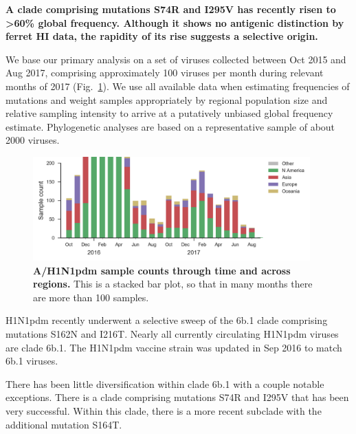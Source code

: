 \documentclass[11pt,oneside,letterpaper]{article}
\newcommand{\FIG}[1]{Fig.~\ref{#1}}
\begin{document}
\textbf{A clade comprising mutations S74R and I295V has recently risen
to \textgreater{}60\% global frequency. Although it shows no antigenic
distinction by ferret HI data, the rapidity of its rise suggests a
selective origin.}

We base our primary analysis on a set of viruses collected between Oct
2015 and Aug 2017, comprising approximately 100 viruses per month during
relevant months of 2017 (\FIG{h1n1pdm_counts}). We use all available data when estimating
frequencies of mutations and weight samples appropriately by regional
population size and relative sampling intensity to arrive at a
putatively unbiased global frequency estimate. Phylogenetic analyses are
based on a representative sample of about 2000 viruses.

\begin{figure}[H]
  \centering
  \includegraphics[width=0.95\textwidth]{../figures/sep-2017/h1n1pdm_counts.png}
  \caption{\textbf{A/H1N1pdm sample counts through time and across regions.}
  This is a stacked bar plot, so that in many months there are more than 100 samples.
  }
  \label{h1n1pdm_counts}
\end{figure}

H1N1pdm recently underwent a selective sweep of the 6b.1 clade
comprising mutations S162N and I216T. Nearly all currently circulating
H1N1pdm viruses are clade 6b.1. The H1N1pdm vaccine strain was updated
in Sep 2016 to match 6b.1 viruses.

There has been little diversification within clade 6b.1 with a couple
notable exceptions. There is a clade comprising mutations S74R and I295V
that has been very successful. Within this clade, there is a more recent
subclade with the additional mutation S164T.
\end{document}
